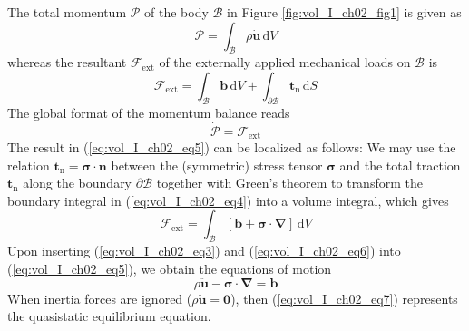 The total momentum $\bm{\mathcal{P}}$ of the body $\mathcal{B}$ in Figure
\ref{fig:vol_I_ch02_fig1} is given as
\begin{equation}
  \bm{\mathcal{P}}=\int_{\mathcal{B}} \rho \dot{\bm {u}} \,{\mathrm{d}}V
  \label{eq:vol_I_ch02_eq3}
\end{equation}
whereas the resultant $\bm{{\mathcal F}}_{\mathrm{ext}}$ of the externally
applied mechanical loads on $\mathcal{B}$ is
\begin{equation}
  \bm{{\mathcal F}}_{\mathrm{ext}}=\int_{\mathcal{B}} \bm{b} \,{\mathrm{d}}V + \int_{\partial \mathcal{B}} \bm{t}_{\mathrm{n}} \,{\mathrm{d}}S
    \label{eq:vol_I_ch02_eq4}
\end{equation}
The global format of the momentum balance reads
\begin{equation}
  \bm{\dot{\mathcal{P}}}=\bm{{\mathcal F}}_{\mathrm{ext}}
     \label{eq:vol_I_ch02_eq5}
\end{equation}
The result in (\ref{eq:vol_I_ch02_eq5}) can be localized as follows:
We may use the relation $\bm{t}_{\mathrm{n}}=\bm{\sigma} \cdot\bm{n}$
between the (symmetric) stress tensor $\bm{\sigma}$ and the total traction
$\bm{t}_{\mathrm{n}}$ along the boundary $\partial \mathcal{B}$ together with
Green's theorem to transform the boundary integral in
(\ref{eq:vol_I_ch02_eq4}) into a volume integral, which gives
\begin{equation}
  \bm{{\mathcal F}}_{\mathrm{ext}} =
  \int_{\mathcal{B}}[\bm{b}+{\bm\sigma}\cdot{\bm\nabla}]\,{\mathrm{d}}V
     \label{eq:vol_I_ch02_eq6}
\end{equation}
Upon inserting (\ref{eq:vol_I_ch02_eq3}) and
(\ref{eq:vol_I_ch02_eq6}) into (\ref{eq:vol_I_ch02_eq5}), we obtain
the equations of motion
\begin{equation}
   \rho\ddot{\bm{u}} - {\bm\sigma}\cdot{\bm\nabla} = \bm{b}
  \label{eq:vol_I_ch02_eq7}
\end{equation}
When inertia forces are ignored ($\rho\ddot{\bm{u}}=\bm{0}$), then
(\ref{eq:vol_I_ch02_eq7}) represents the quasistatic equilibrium
equation.


